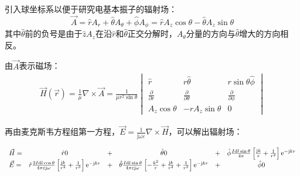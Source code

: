     引入球坐标系以便于研究电基本振子的辐射场：
    \begin{equation}
        \vec{A}=\hat{r}A_r+\hat{\theta}A_\theta+\hat{\phi}A_\phi=\hat{r}A_z\cos\theta-\hat{\theta}A_z\sin\theta
    \end{equation}
    其中$\hat{\theta}$前的负号是由于$\hat{z}A_z$在沿$\hat{r}$和$\hat{\theta}$正交分解时，$A_\theta$分量的方向与$\hat{\theta}$增大的方向相反。

    由$\vec{A}$表示磁场：
    \begin{equation}
        \begin{aligned}
            \vec{H}(\vec{r})=\frac{1}{\mu}\nabla\times \vec{A}
            =\frac{1}{\mu r^2\sin\theta}\begin{vmatrix}
                \hat{r}&r\hat{\theta}&r\sin\theta\hat{\phi}\\
                \frac{\partial }{\partial r}&\frac{\partial }{\partial \theta}&\frac{\partial }{\partial \phi}\\
                A_z\cos\theta&-rA_z\sin\theta&0
            \end{vmatrix}
        \end{aligned}
    \end{equation}

    再由麦克斯韦方程组第一方程，$\vec{E}=\frac{1}{\mathrm{j}\omega \varepsilon}\nabla\times \vec{H}$，可以解出辐射场：

    \begin{equation}
        \begin{array}{l c cc cc}
            \vec{H}=&\hat{r}0 &+&\hat{\theta}0&+&\hat{\phi}\frac{I \mathrm{d}l\sin\theta}{4\pi}\left[\frac{\mathrm{j}k}{r}+\frac{1}{r^2}\right]\mathrm{e}^{-\mathrm{j}k r}\\
            \vec{E}=&\hat{r}\frac{2I \mathrm{d}l\cos\theta}{4\pi \varepsilon \mathrm{j}\omega}\left[\frac{\mathrm{j}k}{r^2}+\frac{1}{r^3}\right]\mathrm{e}^{-\mathrm{j}k r} &+&\hat{\theta}\frac{I \mathrm{d}l\sin\theta}{4\pi \varepsilon \mathrm{j}\omega}\left[-\frac{k^2}{r}+\frac{\mathrm{j}k}{r^2}+\frac{1}{r^3}\right]\mathrm{e}^{-\mathrm{j}k r}&+&\hat{\phi}0\\
        \end{array}
    \end{equation}

    


